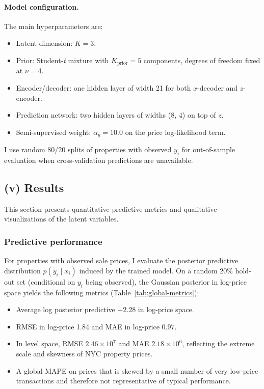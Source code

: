 \documentclass[11pt]{article}
\begin{document}
\paragraph{Model configuration.} The main hyperparameters are:
\begin{itemize}[noitemsep]
    \item Latent dimension: $K = 3$.
    \item Prior: Student-\emph{t} mixture with $K_{\text{prior}} = 5$ components, degrees of freedom fixed at $\nu = 4$.
    \item Encoder/decoder: one hidden layer of width 21 for both $x$-decoder and $z$-encoder.
    \item Prediction network: two hidden layers of widths (8, 4) on top of $z$.
    \item Semi-supervised weight: $\alpha_y = 10.0$ on the price log-likelihood term.
\end{itemize}

I use random 80/20 splits of properties with observed $y_i$ for out-of-sample evaluation when cross-validation predictions are unavailable.

\subsection*{(v) Results}

This section presents quantitative predictive metrics and qualitative visualizations of the latent variables.

\subsubsection*{Predictive performance}

For properties with observed sale prices, I evaluate the posterior predictive distribution $p(y_i \mid x_i)$ induced by the trained model. On a random 20\% hold-out set (conditional on $y_i$ being observed), the Gaussian posterior in log-price space yields the following metrics (Table~\ref{tab:global-metrics}):

\begin{itemize}[noitemsep]
    \item Average log posterior predictive $-2.28$ in log-price space.
    \item RMSE in log-price 1.84 and MAE in log-price 0.97.
    \item In level space, RMSE $2.46\times 10^7$ and MAE $2.18\times 10^6$, reflecting the extreme scale and skewness of NYC property prices.
    \item A global MAPE on prices that is skewed by a small number of very low-price transactions and therefore not representative of typical performance.
\end{itemize}
\end{document}
